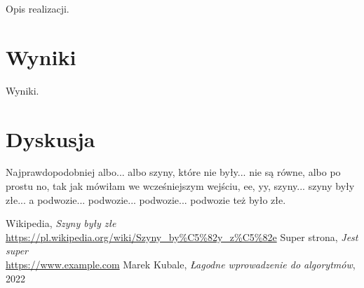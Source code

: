 \documentclass{article}
\begin{document}
Opis realizacji.

\section{Wyniki}

Wyniki.

\section{Dyskusja}

Najprawdopodobniej albo... albo szyny, 
które nie były... nie są równe, 
albo po prostu no, tak jak mówiłam we 
wcześniejszym wejściu, ee, yy, szyny... 
szyny były złe... a podwozie... podwozie... 
podwozie... podwozie też było złe. \cite{szyny}

\renewcommand{\refname}{Źródła}
\begin{thebibliography}{100}
     Wikipedia, 
    \textit{Szyny były złe} 
    \\\url{https://pl.wikipedia.org/wiki/Szyny_by%C5%82y_z%C5%82e}
     Super strona,
    \textit{Jest super}
    \\\url{https://www.example.com}
     Marek Kubale,
    \textit{Łagodne wprowadzenie do algorytmów}, 2022
\end{thebibliography}
\end{document}
